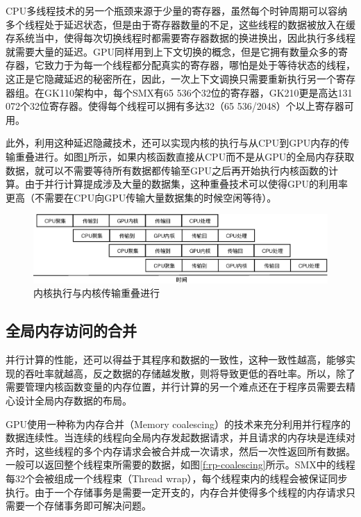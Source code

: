 CPU多线程技术的另一个瓶颈来源于少量的寄存器，虽然每个时钟周期可以容纳多个线程处于延迟状态，但是由于寄存器数量的不足，这些线程的数据被放入在缓存系统当中，使得每次切换线程时都需要寄存器数据的换进换出，因此执行多线程就需要大量的延迟。GPU同样用到上下文切换的概念，但是它拥有数量众多的寄存器，它致力于为每一个线程都分配真实的寄存器，哪怕是处于等待状态的线程，这正是它隐藏延迟的秘密所在，因此，一次上下文调换只需要重新执行另一个寄存器组。在GK110架构中，每个SMX有65 536个32位的寄存器，GK210更是高达131 072个32位寄存器。使得每个线程可以拥有多达32（65 536/2048）个以上寄存器可用。

此外，利用这种延迟隐藏技术，还可以实现内核的执行与从CPU到GPU内存的传输重叠进行。如图\ref{f:rp-streaming}所示，如果内核函数直接从CPU而不是从GPU的全局内存获取数据，就可以不需要等待所有数据都传输至GPU之后再开始执行内核函数的计算。由于并行计算提成涉及大量的数据集，这种重叠技术可以使得GPU的利用率更高（不需要在CPU向GPU传输大量数据集的时候空闲等待）。

\begin{figure}
	\includegraphics[width=1.\textwidth]{figures/rp/streaming}
	\caption{内核执行与内核传输重叠进行}
	\label{f:rp-streaming}
\end{figure}




\subsection{全局内存访问的合并}
并行计算的性能，还可以得益于其程序和数据的一致性，这种一致性越高，能够实现的吞吐率就越高，反之数据的存储越发散，则将导致更低的吞吐率。所以，除了需要管理内核函数变量的内存位置，并行计算的另一个难点还在于程序员需要去精心设计全局内存数据的布局。

GPU使用一种称为内存合并（Memory coalescing）的技术来充分利用并行程序的数据连续性。当连续的线程向全局内存发起数据请求，并且请求的内存块是连续对齐时，这些线程的多个内存请求会被合并成一次请求，然后一次性返回所有数据。一般可以返回整个线程束所需要的数据，如图\ref{f:rp-coalescing}所示。SMX中的线程每32个会被组成一个线程束（Thread wrap），每个线程束内的线程会被保证同步执行。由于一个存储事务是需要一定开支的，内存合并使得多个线程的内存请求只需要一个存储事务即可解决问题。

